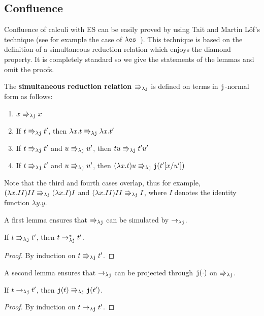\documentclass{LMCS}
\renewcommand{\>}{\rightarrow}
\def\lam{\lambda}
\newcommand{\Rew}[1]{\rightarrow_{#1}}
\newcommand{\Rewn}[2][*]{\rightarrow^{#1}_{#2}}
\newcommand{\es}{{\tt es}}
\newcommand{\les}{\lam \es}
\newcommand{\dis}{{\tt j}}
\newcommand{\ldis}{\lam{\dis}}
\newcommand{\paralp}[1]{\Rrightarrow_{#1}}
\newcommand{\deft}[1]{{\bf #1}}
\newcommand{\fc}{\dis}
\begin{document}
\subsection{Confluence}
\label{ss:struct-confluence}
Confluence of calculi with  ES can be easily proved
by using Tait  and Martin L\"of's technique (see for  example the
case of $\les$~\cite{Kes07}). This  technique is based
on the definition of a simultaneous reduction relation
 which enjoys the  diamond property. It is completely standard so we give the statements of the lemmas and omit the proofs. \medskip

The \deft{simultaneous reduction relation $\paralp{\ldis}$} is defined on terms in $\dis$-normal form as follows:
\begin{enumerate}[$\bullet$]
\item $x \paralp{\ldis} x$
\item If $t  \paralp{\ldis} t'$, then $\lam x. t  \paralp{\ldis} \lam x. t'$
\item If $t  \paralp{\ldis} t'$ and $u \paralp{\ldis} u'$, then $t u  \paralp{\ldis} t' u'$
\item If $t  \paralp{\ldis} t'$ and
         $u \paralp{\ldis} u'$, then $(\lam x. t) u  \paralp{\ldis} \fc(t'[x/u'])$
\end{enumerate}
Note that the third and fourth cases overlap, thus for example,
$(\lam x. II)II \paralp{\ldis} (\lam x. I)I$
and $(\lam x. II)II \paralp{\ldis} I$, where $I$ denotes the identity
function $\lam y. y$.

 A first lemma ensures that $\paralp{\ldis}$ can be simulated by $\Rew{\ldis}$.

\begin{lem}
\label{l:paral-Rewn}
If $t \paralp{\ldis} t'$, then $t \Rewn{\ldis} t'$. 
\end{lem}

\begin{proof}
By induction on $t \paralp{\ldis} t'$. 
\end{proof}

A second lemma ensures that $\Rew{\ldis}$ can be projected through $\fc(\cdot)$ on $\paralp{\ldis}$.

\begin{lem}
\label{l:Rew-xc-paral}
If $t \Rew{\ldis} t'$, then $\fc(t) \paralp{\ldis} \fc(t')$. 
\end{lem}

\begin{proof}
By induction on $t \Rew{\ldis} t'$.
\end{proof}
\end{document}
